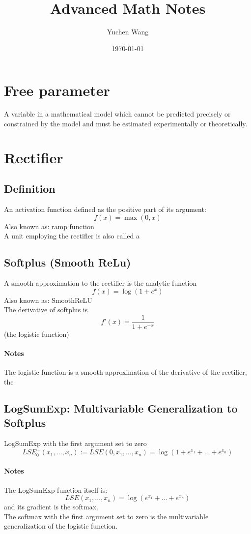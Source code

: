 \documentclass[11pt]{article}
\title{Advanced Math Notes}
\author{Yuchen Wang}
\date{\today}
\begin{document}
	\maketitle
	\tableofcontents
	\newpage
	\section{Free parameter}
	A variable in a mathematical model which cannot be predicted precisely or constrained by the model and must be estimated experimentally or theoretically.
	\section{Rectifier}
	\subsection{Definition}
	An activation function defined as the positive part of its argument:
	$$f(x) = \max(0,x)$$
	Also known as: ramp function \\
	A unit employing the rectifier is also called a 
	\subsection{Softplus (Smooth ReLu)}
	A smooth approximation to the rectifier is the analytic function $$f(x) = \log(1+e^x)$$
	Also known as: SmoothReLU\\
	The derivative of softplus is $$f'(x) = \frac{1}{1+e^{-x}}$$(the logistic function)
	\paragraph{Notes}
	The logistic function is a smooth approximation of the derivative of the rectifier, the 
	\subsection{LogSumExp: Multivariable Generalization to Softplus}
	LogSumExp with the first argument set to zero
	$$LSE_0^+(x_1,\hdots,x_n) := LSE(0,x_1,\hdots,x_n) = \log(1+e^{x_1} + \hdots + e^{x_n})$$
	\paragraph{Notes}
	The LogSumExp function itself is:
	$$LSE(x_1,\hdots,x_n) = \log(e^{x_1} + \hdots + e^{x_n})$$
	and its gradient is the softmax.\\
	The softmax with the first argument set to zero is the multivariable generalization of the logistic function.
\end{document}
